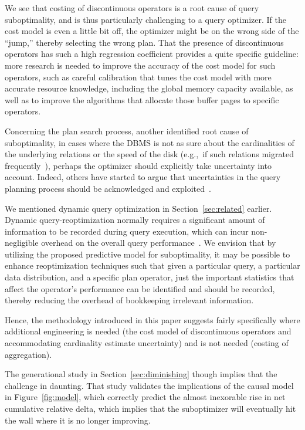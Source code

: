 \documentclass[prodmode,acmtods]{acmsmall}
\begin{document}
We see that costing of \hbox{discontinuous} operators is a
root cause of query suboptimality, and is thus particularly challenging to a
query optimizer. If the cost model is even a little bit off, the optimizer
might be on the wrong side of the ``jump,'' thereby selecting the wrong
plan.  That the presence of discontinuous operators has such a high
regression coefficient provides a quite specific guideline: more research is
needed to improve the accuracy of the cost model for such operators, such as
careful calibration that tunes the cost model with more accurate resource
knowledge, including the global memory capacity available, as well as to
improve the algorithms that allocate those buffer pages to specific
operators.

Concerning the plan search
process, another identified root cause of suboptimality, in cases
where the \hbox{DBMS} is not as sure about the cardinalities of the underlying
relations or the speed of the disk (e.g.,~if such relations migrated
frequently~\cite{reiss03}), 
perhaps the optimizer should
explicitly take uncertainty into account. Indeed, others have started to
\hbox{argue} that uncertainties in the query planning process should be
acknowledged and exploited~\cite{Babcock05}.

We mentioned dynamic query optimization in Section~\ref{sec:related}
earlier.  Dynamic query-reoptimization normally requires a significant
amount of information to be recorded during query execution, which can incur
non-negligible overhead on the overall query
performance~\cite{Avnur,kabra98}.  We envision that by utilizing the
proposed predictive model for suboptimality, it may be possible to enhance
reoptimization techniques such that given a particular query, a particular
data distribution, and a specific plan operator, just the important
statistics that affect the operator's performance can be identified and
should be recorded, thereby reducing the overhead of bookkeeping irrelevant
\hbox{information}.

Hence, the methodology introduced in this paper suggests fairly specifically where additional
engineering is needed (the cost model of discontinuous
operators and accommodating cardinality estimate uncertainty) and is not
needed (costing of aggregation).

The generational study in Section~\ref{sec:diminishing} though implies that
the challenge in daunting. That study validates the implications of the
causal model in Figure~\ref{fig:model}, which correctly predict  the almost
inexorable rise in net cumulative relative delta, which implies that the
suboptimizer will eventually hit the wall where it is no longer improving.
\end{document}
